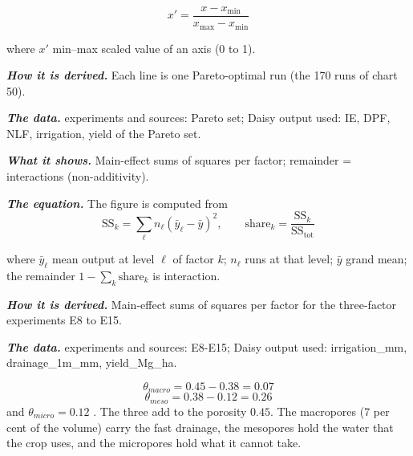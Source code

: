 \begin{equation}\boxed{x'=\dfrac{x-x_{\min}}{x_{\max}-x_{\min}}}\end{equation}
\par\noindent where $x'$ min--max scaled value of an axis (0 to 1).
\par\noindent\textbf{\color{khmag}\emph{How it is derived.}} Each line is one Pareto-optimal run (the 170 runs of chart 50).
\par\noindent\textbf{\color{khmag}\emph{The data.}} experiments and sources: Pareto set; Daisy output used: IE, DPF, NLF, irrigation, yield of the Pareto set.
\par\vspace{6pt}\noindent{}\par\nobreak
{}\label{fig:a21_13}
\par\noindent\textbf{\color{khmag}\emph{What it shows.}} Main-effect sums of squares per factor; remainder = interactions (non-additivity).
\par\noindent\textbf{\color{khmag}\emph{The equation.}} The figure is computed from
\begin{equation}\boxed{\mathrm{SS}_k=\sum_{\ell} n_\ell(\bar y_\ell-\bar y)^2,\qquad \text{share}_k=\dfrac{\mathrm{SS}_k}{\mathrm{SS}_{\mathrm{tot}}}}\end{equation}
\par\noindent where $\bar y_\ell$ mean output at level $\ell$ of factor $k$; $n_\ell$ runs at that level; $\bar y$ grand mean; the remainder $1-\sum_k\text{share}_k$ is interaction.
\par\noindent\textbf{\color{khmag}\emph{How it is derived.}} Main-effect sums of squares per factor for the three-factor experiments E8 to E15.
\par\noindent\textbf{\color{khmag}\emph{The data.}} experiments and sources: E8-E15; Daisy output used: irrigation\_mm, drainage\_1m\_mm, yield\_Mg\_ha.
\sol {}
\par\noindent \[\theta_{macro}=0.45-0.38=0.07\]
\[\theta_{meso}=0.38-0.12=0.26\] and $\theta_{micro}=0.12$ \finans. The three add to the porosity $0.45$. The macropores (7 per cent of the volume) carry the fast drainage, the mesopores hold the water that the crop uses, and the micropores hold what it cannot take.

